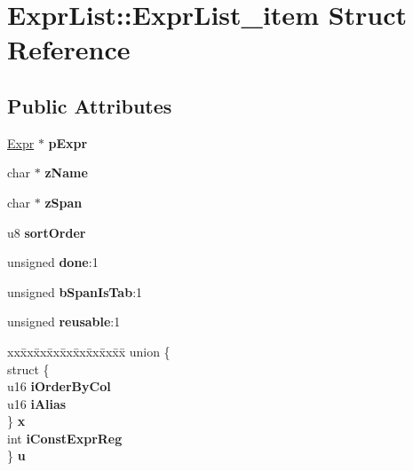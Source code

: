 \hypertarget{struct_expr_list_1_1_expr_list__item}{}\section{Expr\+List\+:\+:Expr\+List\+\_\+item Struct Reference}
\label{struct_expr_list_1_1_expr_list__item}
\subsection*{Public Attributes}
\begin{DoxyCompactItemize}
\item 
\mbox{\label{struct_expr_list_1_1_expr_list__item_a75906cf3ff19e5bf16373fec7f3c79ad}} 
\mbox{\hyperlink{struct_expr}{Expr}} $\ast$ {\bfseries p\+Expr}
\item 
\mbox{\label{struct_expr_list_1_1_expr_list__item_af278eb03a1169c73d144547adaf9b04f}} 
char $\ast$ {\bfseries z\+Name}
\item 
\mbox{\label{struct_expr_list_1_1_expr_list__item_ade485bb6fafb44ec2aba59d05b8d117b}} 
char $\ast$ {\bfseries z\+Span}
\item 
\mbox{\label{struct_expr_list_1_1_expr_list__item_af9084dc073f96792c0c7a8a894778881}} 
u8 {\bfseries sort\+Order}
\item 
\mbox{\label{struct_expr_list_1_1_expr_list__item_a0100abfbd214ec2199dd25e4bce05dcb}} 
unsigned {\bfseries done}\+:1
\item 
\mbox{\label{struct_expr_list_1_1_expr_list__item_a05e84a6dbbf69cea042d3bf888955999}} 
unsigned {\bfseries b\+Span\+Is\+Tab}\+:1
\item 
\mbox{\label{struct_expr_list_1_1_expr_list__item_a066f924fb690e78cd2833770f737a13b}} 
unsigned {\bfseries reusable}\+:1
\item 
\mbox{\label{struct_expr_list_1_1_expr_list__item_a36387db7fc4266d4c805d83f7b1bb66b}} 
\begin{tabbing}
xx\=xx\=xx\=xx\=xx\=xx\=xx\=xx\=xx\=\kill
union \{\\
\>struct \{\\
\>\>u16 {\bfseries iOrderByCol}\\
\>\>u16 {\bfseries iAlias}\\
\>\} {\bfseries x}\\
\>int {\bfseries iConstExprReg}\\
\} {\bfseries u}\\


\end{tabbing}
\end{DoxyCompactItemize}

